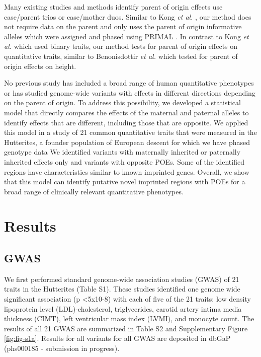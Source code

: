 Many existing studies and methods identify parent of origin effects use case/parent trios or case/mother duos\citep{Chuang:2017kp,Howey:2012hj,Ainsworth:2010bp,Weinberg:1999km,Weinberg:1998cf}. Similar to Kong \emph{et al.} \citep{Kong:2009kk}, our method does not require data on the parent and only uses the parent of origin informative alleles which were assigned and phased using PRIMAL \citep{Livne2015}.  In contrast to Kong \emph{et al.} \citep{Kong:2009kk} which used binary traits, our method tests for parent of origin effects on quantitative traits, similar to Benonisdottir \emph{et al.} \citep{Benonisdottir:2016dz} which tested for parent of origin effects on height.

No previous study has included a broad range of human quantitative phenotypes or has studied genome-wide variants with effects in different directions depending on the parent of origin. To address this possibility, we developed a statistical model that directly compares the effects of the maternal and paternal alleles to identify effects that are different, including those that are opposite. We applied this model in a study of 21 common quantitative traits that were measured in the Hutterites, a founder population of European descent for which we have phased genotype data \citep{Livne2015} We identified variants with maternally inherited or paternally inherited effects only and variants with opposite POEs. Some of the identified regions have characteristics similar to known imprinted genes. Overall, we show that this model can identify putative novel imprinted regions with POEs for a broad range of clinically relevant quantitative phenotypes.

\section{Results}\label{ch02-results}

\subsection{GWAS}\label{GWAS Results}
We first performed standard genome-wide association studies (GWAS) of 21 traits in the Hutterites (Table S1). These studies identified one genome wide significant association (p \textless 5x10-8) with each of five of the 21 traits: low density lipoprotein level (LDL)-cholesterol, triglycerides, carotid artery intima media thickness (CIMT), left ventricular mass index (LVMI), and monocyte count. The results of all 21 GWAS are summarized in Table S2 and Supplementary Figure \ref{fig:fig-s1a}. Results for all variants for all GWAS are deposited in dbGaP (phs000185 - submission in progress).

